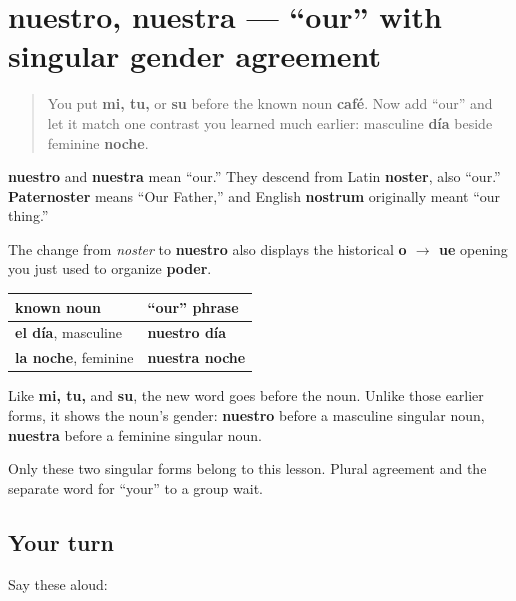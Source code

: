 \section[nuestro, nuestra]{nuestro, nuestra — “our” with singular gender agreement}

\label{lesson:ES-C11-nuestro}



\begin{quote}
You put \textbf{mi, tu,} or \textbf{su} before the known noun \textbf{café}. Now add “our” and let it match one contrast you learned much earlier: masculine \textbf{día} beside feminine \textbf{noche}.
\end{quote}

\begin{cousinweb}
\textbf{nuestro} and \textbf{nuestra} mean “our.” They descend from Latin \textbf{noster}, also “our.” \textbf{Paternoster} means “Our Father,” and English \textbf{nostrum} originally meant “our thing.”

The change from \emph{noster} to \textbf{nuestro} also displays the historical \textbf{o $\to$ ue} opening you just used to organize \textbf{poder}.
\end{cousinweb}

\begin{grammarlens}[title={Grammar Lens: match singular gender}]
\noindent
\begin{tabularx}{\linewidth}{@{}>{\raggedright\arraybackslash}X>{\raggedright\arraybackslash}X@{}}
\toprule
\textbf{known noun} & \textbf{“our” phrase} \\
\midrule
\textbf{el día}, masculine & \textbf{nuestro día} \\
\textbf{la noche}, feminine & \textbf{nuestra noche} \\
\bottomrule
\end{tabularx}

Like \textbf{mi, tu,} and \textbf{su}, the new word goes before the noun. Unlike those earlier forms, it shows the noun's gender: \textbf{nuestro} before a masculine singular noun, \textbf{nuestra} before a feminine singular noun.

Only these two singular forms belong to this lesson. Plural agreement and the separate word for “your” to a group wait.
\end{grammarlens}

\subsection*{Your turn}
Say these aloud:

